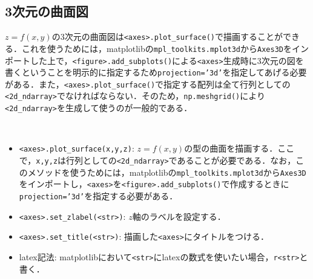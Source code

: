 \begin{cod}[\texttt{fig3.py}]　
}]{code/fig3.py}
\vspace{-19pt}
\begin{figure}[H]
\begin{center}
\framed
\texttt{[image: code/fig3.eps]}
\vspace{-10pt}
\caption{\texttt{fig3.eps}}
\endframed
\end{center}
\end{figure}
\end{cod}
\vspace{-20pt}

\subsection{3次元の曲面図}

$z=f(x,y)$の3次元の曲面図は\texttt{<axes>.plot\_surface()}で描画することができる．これを使うためには，matplotlibの\texttt{mpl\_toolkits.mplot3d}から\texttt{Axes3D}をインポートした上で，\texttt{<figure>.add\_subplots()}による\texttt{<axes>}生成時に3次元の図を書くということを明示的に指定するため\texttt{projection='3d'}を指定してあげる必要がある．また，\texttt{<axes>.plot\_surface()}で指定する配列は全て行列としての\texttt{<2d\_ndarray>}でなければならない．そのため，\texttt{np.meshgrid()}により\texttt{<2d\_ndarray>}を生成して使うのが一般的である．

\begin{gram}　
\begin{itemize}
\item \texttt{<axes>.plot\_surface(x,y,z)}: $z=f(x,y)$の型の曲面を描画する．ここで，\texttt{x,y,z}は行列としての\texttt{<2d\_ndarray>}であることが必要である．なお，このメソッドを使うためには，matplotlibの\texttt{mpl\_toolkits.mplot3d}から\texttt{Axes3D}をインポートし，\texttt{<axes>}を\texttt{<figure>.add\_subplots()}で作成するときに\texttt{projection='3d'}を指定する必要がある．
\item \texttt{<axes>.set\_zlabel(<str>)}: $z$軸のラベルを設定する．
\item \texttt{<axes>.set\_title(<str>)}: 描画した\texttt{<axes>}にタイトルをつける．
\item latex記法: matplotlibにおいて\texttt{<str>}にlatexの数式を使いたい場合，\texttt{r<str>}と書く．
\end{itemize}
\end{gram}

